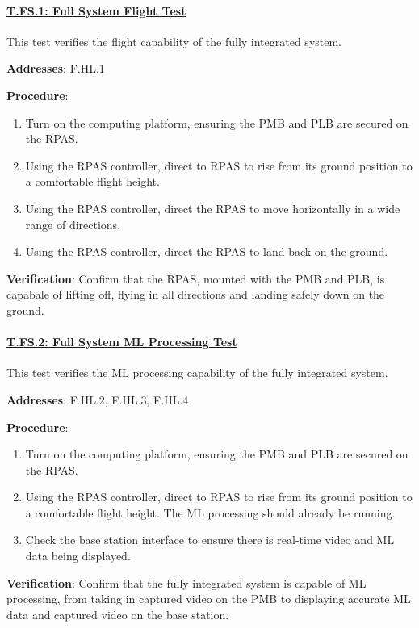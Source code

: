 \paragraph{\underline{T.FS.1: Full System Flight Test}}

This test verifies the flight capability of the fully integrated system.

\textbf{Addresses}: F.HL.1

\textbf{Procedure}:
\begin{enumerate}[noitemsep]
    \item Turn on the computing platform, ensuring the PMB and PLB are secured on the RPAS.
    \item Using the RPAS controller, direct to RPAS to rise from its ground position to a comfortable flight height.
    \item Using the RPAS controller, direct the RPAS to move horizontally in a wide range of directions.
    \item Using the RPAS controller, direct the RPAS to land back on the ground.
\end{enumerate}

\textbf{Verification}:
Confirm that the RPAS, mounted with the PMB and PLB, is capabale of lifting off, flying in all directions and landing safely down on the ground.

%

\paragraph{\underline{T.FS.2: Full System ML Processing Test}}

This test verifies the ML processing capability of the fully integrated system.

\textbf{Addresses}: F.HL.2, F.HL.3, F.HL.4

\textbf{Procedure}:
\begin{enumerate}[noitemsep]
    \item Turn on the computing platform, ensuring the PMB and PLB are secured on the RPAS.
    \item Using the RPAS controller, direct to RPAS to rise from its ground position to a comfortable flight height. The ML processing should already be running.
    \item Check the base station interface to ensure there is real-time video and ML data being displayed.
\end{enumerate}

\textbf{Verification}:
Confirm that the fully integrated system is capable of ML processing, from taking in captured video on the PMB to displaying accurate ML data and captured video on the base station.